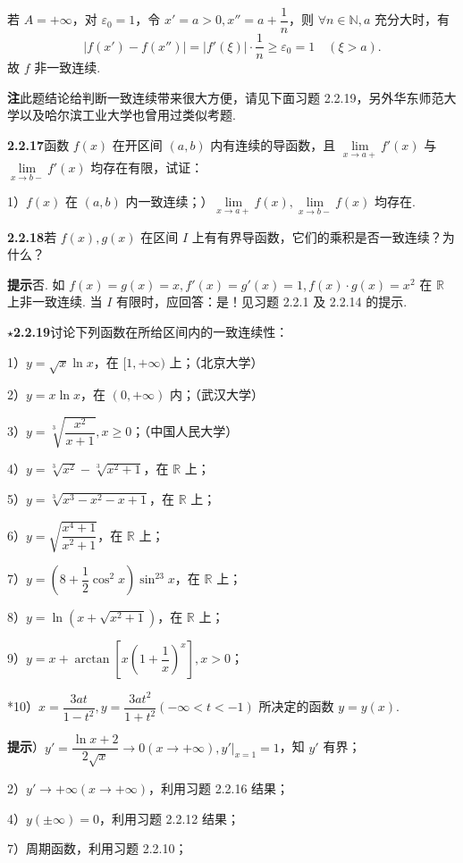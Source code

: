 \documentclass[UTF8, 12pt, fontset=fandol, oneside]{ctexart}
\begin{document}
若 $A=+\infty$，对 $\varepsilon_0=1$，令 $x'=a>0,x''=a+\dfrac1n$，则 $\forall n\in\mathbb{N},a$ 充分大时，有
\[
  |f(x')-f(x'')|=|f'(\xi)|\cdot\frac1n\ge\varepsilon_0=1\quad(\xi>a).
\]
故 $f$ 非一致连续.

\noindent\textbf{注}\quad 此题结论给判断一致连续带来很大方便，请见下面习题 2.2.19，另外华东师范大学以及哈尔滨工业大学也曾用过类似考题.

\noindent\textbf{2.2.17}\quad 函数 $f(x)$ 在开区间 $(a,b)$ 内有连续的导函数，且 $\lim\limits_{x\to a+}f'(x)$ 与 $\lim\limits_{x\to b-}f'(x)$ 均存在有限，试证：

1）$f(x)$ 在 $(a,b)$ 内一致连续；）$\lim\limits_{x\to a+}f(x),\lim\limits_{x\to b-}f(x)$ 均存在.

\noindent\textbf{2.2.18}\quad 若 $f(x),g(x)$ 在区间 $I$ 上有有界导函数，它们的乘积是否一致连续？为什么？

\noindent\textbf{提示}\quad 否. 如 $f(x)=g(x)=x,f'(x)=g'(x)=1,f(x)\cdot g(x)=x^2$ 在 $\mathbb{R}$ 上非一致连续. 当 $I$ 有限时，应回答：是！见习题 2.2.1 及 2.2.14 的提示.

\noindent\textbf{$\star$2.2.19}\quad 讨论下列函数在所给区间内的一致连续性：

1）$y=\sqrt{x}\ln x$，在 $[1,+\infty)$ 上；（北京大学）

2）$y=x\ln x$，在 $(0,+\infty)$ 内；（武汉大学）

3）$y=\sqrt[3]{\dfrac{x^2}{x+1}},x\ge0$；（中国人民大学）

4）$y=\sqrt[3]{x^2}-\sqrt[3]{x^2+1}$，在 $\mathbb{R}$ 上；

5）$y=\sqrt[3]{x^3-x^2-x+1}$，在 $\mathbb{R}$ 上；

6）$y=\sqrt{\dfrac{x^4+1}{x^2+1}}$，在 $\mathbb{R}$ 上；

7）$y=\left(8+\dfrac12\cos^2x\right)\sin^23x$，在 $\mathbb{R}$ 上；

8）$y=\ln\left(x+\sqrt{x^2+1}\right)$，在 $\mathbb{R}$ 上；

9）$y=x+\arctan\left[x\left(1+\dfrac1x\right)^x\right],x>0$；

*10）$x=\dfrac{3at}{1-t^2},y=\dfrac{3at^2}{1+t^2}(-\infty<t<-1)$ 所决定的函数 $y=y(x)$.

\noindent\textbf{提示}）$y'=\dfrac{\ln x+2}{2\sqrt{x}}\to0(x\to+\infty),y'|_{x=1}=1$，知 $y'$ 有界；

2）$y'\to+\infty(x\to+\infty)$，利用习题 2.2.16 结果；

4）$y(\pm\infty)=0$，利用习题 2.2.12 结果；

7）周期函数，利用习题 2.2.10；
\end{document}
